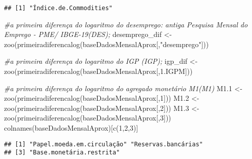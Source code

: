 \documentclass[
]{article}
\newenvironment{Shaded}{\begin{snugshade}}{\end{snugshade}}
\newcommand{\CommentTok}[1]{\textcolor[rgb]{0.56,0.35,0.01}{\textit{#1}}}
\newcommand{\DecValTok}[1]{\textcolor[rgb]{0.00,0.00,0.81}{#1}}
\newcommand{\FloatTok}[1]{\textcolor[rgb]{0.00,0.00,0.81}{#1}}
\newcommand{\FunctionTok}[1]{\textcolor[rgb]{0.00,0.00,0.00}{#1}}
\newcommand{\NormalTok}[1]{#1}
\newcommand{\OtherTok}[1]{\textcolor[rgb]{0.56,0.35,0.01}{#1}}
\newcommand{\StringTok}[1]{\textcolor[rgb]{0.31,0.60,0.02}{#1}}
\begin{document}
\begin{verbatim}
## [1] "Índice.de.Commodities"
\end{verbatim}

\begin{Shaded}
\begin{Highlighting}[]
\CommentTok{\#a primeira diferença do logaritmo do desemprego: antiga Pesquisa Mensal do Emprego {-} PME/ IBGE{-}19(DES);}
\NormalTok{desemprego\_dif }\OtherTok{\textless{}{-}} \FunctionTok{zoo}\NormalTok{(}\FunctionTok{primeiradiferencalog}\NormalTok{(baseDadosMensalAprox[,}\StringTok{"desemprego"}\NormalTok{]))}

\CommentTok{\#a primeira diferença do logaritmo do IGP (IGP);}
\NormalTok{igp\_dif }\OtherTok{\textless{}{-}} \FunctionTok{zoo}\NormalTok{(}\FunctionTok{primeiradiferencalog}\NormalTok{(baseDadosMensalAprox[,}\StringTok{\textquotesingle{}1.IGPM\textquotesingle{}}\NormalTok{]))}

\CommentTok{\#a primeira diferença do logaritmo do agregado monetário M1(M1)}
\NormalTok{M1}\FloatTok{.1} \OtherTok{\textless{}{-}} \FunctionTok{zoo}\NormalTok{(}\FunctionTok{primeiradiferencalog}\NormalTok{(baseDadosMensalAprox[,}\DecValTok{1}\NormalTok{]))}
\NormalTok{M1}\FloatTok{.2} \OtherTok{\textless{}{-}} \FunctionTok{zoo}\NormalTok{(}\FunctionTok{primeiradiferencalog}\NormalTok{(baseDadosMensalAprox[,}\DecValTok{2}\NormalTok{]))}
\NormalTok{M1}\FloatTok{.3} \OtherTok{\textless{}{-}} \FunctionTok{zoo}\NormalTok{(}\FunctionTok{primeiradiferencalog}\NormalTok{(baseDadosMensalAprox[,}\DecValTok{3}\NormalTok{]))}
\FunctionTok{colnames}\NormalTok{(baseDadosMensalAprox)[}\FunctionTok{c}\NormalTok{(}\DecValTok{1}\NormalTok{,}\DecValTok{2}\NormalTok{,}\DecValTok{3}\NormalTok{)]}
\end{Highlighting}
\end{Shaded}

\begin{verbatim}
## [1] "Papel.moeda.em.circulação" "Reservas.bancárias"       
## [3] "Base.monetária.restrita"
\end{verbatim}
\end{document}
